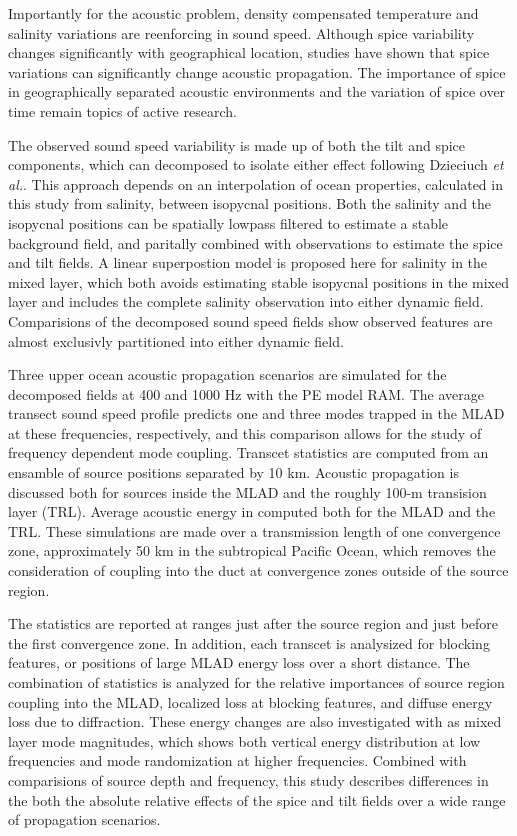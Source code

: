 \documentclass[preprint,NumberedRefs]{JASA}
\begin{document}
Importantly for the acoustic problem, density compensated temperature and salinity variations are reenforcing in sound speed. Although spice variability changes significantly with geographical location, studies have shown that spice variations can significantly change acoustic propagation\citep{colosi12,colosi13,murat2021}. The importance of spice in geographically separated acoustic environments and the variation of spice over time remain topics of active research.

The observed sound speed variability is made up of both the tilt and spice components, which can decomposed to isolate either effect following Dzieciuch \emph{et al.}\citep{dzieciuch2004}. This approach depends on an interpolation of ocean properties, calculated in this study from salinity, between isopycnal positions. Both the salinity and the isopycnal positions can be spatially lowpass filtered to estimate a stable background field, and paritally combined with observations to estimate the spice and tilt fields. A linear superpostion model is proposed here for salinity in the mixed layer, which both avoids estimating stable isopycnal positions in the mixed layer and includes the complete salinity observation into either dynamic field. Comparisions of the decomposed sound speed fields show observed features are almost exclusivly partitioned into either dynamic field.

Three upper ocean acoustic propagation scenarios are simulated for the decomposed fields at 400 and 1000 Hz with the PE model RAM\cite{collins93}. The average transect sound speed profile predicts one and three modes trapped in the MLAD at these frequencies, respectively, and this comparison allows for the study of frequency dependent mode coupling. Transcet statistics are computed from an ensamble of source positions separated by 10 km. Acoustic propagation is discussed both for sources inside the MLAD and the roughly 100-m transision layer (TRL). Average acoustic energy in computed both for the MLAD and the TRL. These simulations are made over a transmission length of one convergence zone\citep{jensen2011computational}, approximately 50 km in the subtropical Pacific Ocean, which removes the consideration of coupling into the duct at convergence zones outside of the source region\citep{colosi2020observations}.

The statistics are reported at ranges just after the source region and just before the first convergence zone. In addition, each transcet is analysized for blocking features\citep{colosi2020observations}, or positions of large MLAD energy loss over a short distance. The combination of statistics is analyzed for the relative importances of source region coupling into the MLAD, localized loss at blocking features, and diffuse energy loss due to diffraction. These energy changes are also investigated with as mixed layer mode magnitudes, which shows both vertical energy distribution at low frequencies and mode randomization at higher frequencies. Combined with comparisions of source depth and frequency, this study describes differences in the both the absolute relative effects of the spice and tilt fields over a wide range of propagation scenarios.
\end{document}
